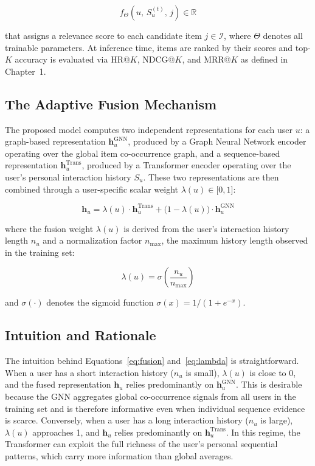 \documentclass[12pt,a4paper]{report}
\begin{document}
\begin{equation}
    f_{\Theta}\!\left(u,\, S_u^{(t)},\, j\right) \in \mathbb{R}
    \label{eq:scoring}
\end{equation}

\noindent that assigns a relevance score to each candidate item
\(j \in \mathcal{I}\), where \(\Theta\) denotes all trainable parameters. At
inference time, items are ranked by their scores and top-\(K\) accuracy is
evaluated via HR@\(K\), NDCG@\(K\), and MRR@\(K\) as defined in
Chapter~1.

\subsection{The Adaptive Fusion Mechanism}

The proposed model computes two independent representations for each user
\(u\): a graph-based representation \(\mathbf{h}_u^{\text{GNN}}\), produced by
a Graph Neural Network encoder operating over the global item co-occurrence
graph, and a sequence-based representation \(\mathbf{h}_u^{\text{Trans}}\),
produced by a Transformer encoder operating over the user's personal
interaction history \(S_u\). These two representations are then combined
through a user-specific scalar weight \(\lambda(u) \in [0, 1\)]\):

\begin{equation}
    \mathbf{h}_u = \lambda(u)\cdot \mathbf{h}_u^{\text{Trans}}
    + \bigl(1 - \lambda(u)\bigr)\cdot \mathbf{h}_u^{\text{GNN}}
    \label{eq:fusion}
\end{equation}

\noindent where the fusion weight \(\lambda(u)\) is derived from the user's
interaction history length \(n_u\) and a normalization factor \(n_{\max}\),
the maximum history length observed in the training set:

\begin{equation}
    \lambda(u) = \sigma\!\left(\frac{n_u}{n_{\max}}\right)
    \label{eq:lambda}
\end{equation}

\noindent and \(\sigma(\cdot)\) denotes the sigmoid function
\(\sigma(x) = 1/(1 + e^{-x})\).

\subsection{Intuition and Rationale}

The intuition behind Equations~\ref{eq:fusion} and~\ref{eq:lambda} is
straightforward. When a user has a short interaction history (\(n_u\) is
small), \(\lambda(u)\) is close to 0, and the fused representation
\(\mathbf{h}_u\) relies predominantly on \(\mathbf{h}_u^{\text{GNN}}\). This
is desirable because the GNN aggregates global co-occurrence signals from all
users in the training set and is therefore informative even when individual
sequence evidence is scarce. Conversely, when a user has a long interaction
history (\(n_u\) is large), \(\lambda(u)\) approaches 1, and \(\mathbf{h}_u\)
relies predominantly on \(\mathbf{h}_u^{\text{Trans}}\). In this regime, the
Transformer can exploit the full richness of the user's personal sequential
patterns, which carry more information than global averages.
\end{document}
